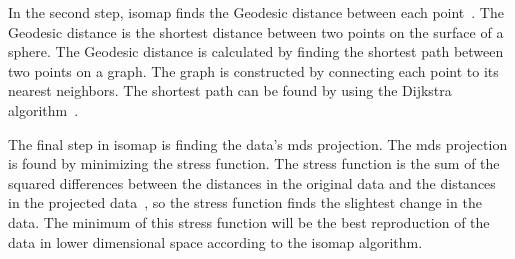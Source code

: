 In the second step, \gls{isomap} finds the Geodesic distance between each point~\cite{Multidimensional-Scaling-Sammon-Mapping-and-Isomap}. The Geodesic distance is the shortest distance between two points on the surface of a sphere. The Geodesic distance is calculated by finding the shortest path between two points on a graph. The graph is constructed by connecting each point to its nearest neighbors. The shortest path can be found by using the Dijkstra algorithm~\cite{multi-dimensional-scaling-leeuw}.

The final step in \gls{isomap} is finding the data's \gls{mds} projection. The \gls{mds} projection is found by minimizing the stress function. The stress function is the sum of the squared differences between the distances in the original data and the distances in the projected data~\cite{multi-dimensional-scaling-leeuw}, so the stress function finds the slightest change in the data. The minimum of this stress function will be the best reproduction of the data in lower dimensional space according to the \gls{isomap} algorithm. 








